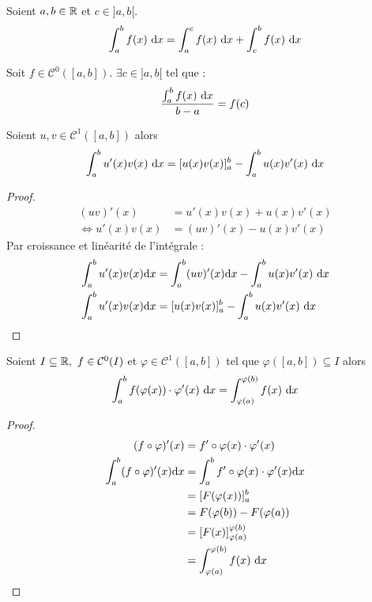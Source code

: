 \begin{proposition}
	Soient $a, b \in \mathbb{R}$ et $c \in ]a, b[$.
	\begin{align*}
		\int_a^b f(x) \ \diffd x = \int_a^c f(x) \ \diffd x + \int_c^b f(x) \ \diffd x
	\end{align*}
\end{proposition}

\begin{theorem}
    Soit $f \in \mathcal{C}^0([a, b])$. $\exists c \in ]a, b[$  tel que :
    \[ \frac{\int_{a}^{b} f(x) \ \diffd x}{b - a} = f(c) \]
\end{theorem}

\begin{theorem}
	Soient $u, v \in \mathcal{C}^1([a, b])$ alors
	\begin{align*}
		\int_a^b u'(x) v(x) \ \diffd x = [u(x)v(x)]_a^b - \int_a^b u(x) v'(x) \ \diffd x
	\end{align*}
  \end{theorem}

\begin{proof}
    \begin{align*}
        (uv)'(x) &= u'(x) v(x) + u(x)v'(x) \\
        \iff u'(x)v(x) &= (uv)'(x) - u(x)v'(x)
    \end{align*}
    Par croissance et linéarité de l'intégrale :
    \begin{align*}
        \int_a^b u'(x)v(x) \diffd x &= \int_a^b (uv)'(x) \diffd x - \int_a^b u(x)v'(x) \ \diffd x \\
        \int_a^b u'(x)v(x) \diffd x &=  [u(x)v(x)]_a^b - \int_a^b u(x)v'(x) \ \diffd x 
    \end{align*}
\end{proof}

\begin{theorem}
	Soient $I \subseteq \mathbb{R},\ f \in \mathcal{C}^0(I)$ et $\varphi \in \mathcal{C}^1([a, b])$ tel que $\varphi ([a, b]) \subseteq I$ alors 
	\begin{align*}
		\int_a^b f(\varphi(x)) \cdot \varphi'(x) \ \diffd x = \int_{\varphi(a)}^{\varphi(b)} f(x) \ \diffd x
	\end{align*}
\end{theorem}

\begin{proof}
    \begin{align*}
        (f \circ \varphi)'(x) &= f' \circ \varphi(x) \cdot \varphi'(x) \\
        \int_a^b (f \circ \varphi)'(x) \diffd x &= \int_a^b f' \circ \varphi(x)  \cdot \varphi'(x) \diffd x \\
         &= [F(\varphi(x))]_a^b \\
         &= F(\varphi(b)) - F(\varphi(a)) \\
         &= [F(x)]_{\varphi(a)}^{\varphi(b)} \\
         &= \int_{\varphi(a)}^{\varphi(b)} f(x) \ \diffd x 
    \end{align*}
\end{proof}

